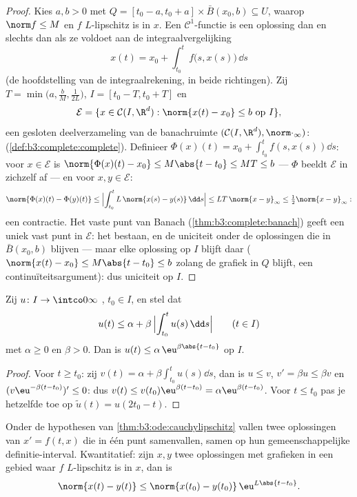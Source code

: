 \begin{proof}
Kies $a, b > 0$ met $Q = [t_0 - a, t_0 + a]\times\bar B(x_0, b)
\subseteq U$, waarop $\norm f \leq M$ en $f$ $L$-lipschitz is in
$x$. Een $\mathcal C^1$-functie is een oplossing dan en slechts
dan als ze voldoet aan de integraalvergelijking
\[
x(t) = x_0 + \int_{t_0}^{t}f\bigl(s, x(s)\bigr)\,\dd s
\]
(de hoofdstelling van de integraalrekening, in beide richtingen).
Zij $T = \min\bigl(a, \frac bM, \frac1{2L}\bigr)$, $I = [t_0 - T,
t_0 + T]$ en
\[
\mathcal E = \{x \in \mathcal C(I, \R^d) : \norm{x(t) - x_0}
\leq b\ \text{op } I\},
\]
een gesloten deelverzameling van de banachruimte $(\mathcal C(I,
\R^d), \norm\cdot_\infty)$: 
(\cref{def:b3:complete:complete}). Definieer $\Phi(x)(t) = x_0 +
\int_{t_0}^tf(s, x(s))\dd s$: voor $x \in \mathcal E$ is
$\norm{\Phi(x)(t) - x_0} \leq M\abs{t - t_0} \leq MT \leq b$ ---
$\Phi$ beeldt $\mathcal E$ in zichzelf af --- en voor $x, y \in
\mathcal E$:
\[
\norm{\Phi(x)(t) - \Phi(y)(t)} \leq \Bigl|\int_{t_0}^t
L\,\norm{x(s) - y(s)}\,\dd s\Bigr| \leq LT\,\norm{x -
y}_\infty \leq \tfrac12\norm{x - y}_\infty :
\]
een contractie. Het vaste punt van Banach
(\cref{thm:b3:complete:banach}) geeft een uniek vast punt in
$\mathcal E$: het bestaan, en de uniciteit onder de oplossingen
die in $\bar B(x_0, b)$ blijven --- maar elke oplossing op $I$
blijft daar ($\norm{x(t) - x_0} \leq M\abs{t - t_0} \leq b$
zolang de grafiek in $Q$ blijft, een continuïteitsargument): dus
uniciteit op $I$.
\end{proof}

\begin{lemma}[Grönwall]\label{lem:b3:ode:gronwall}
Zij $u \colon I \to \intco0\infty$ , $t_0 \in I$, en stel
dat
\[
u(t) \leq \alpha + \beta\,\Bigl|\int_{t_0}^{t}u(s)\,\dd
s\Bigr| \qquad (t \in I)
\]
met $\alpha \geq 0$ en $\beta > 0$. Dan is $u(t) \leq
\alpha\,\eu^{\beta\abs{t - t_0}}$ op $I$.
\end{lemma}

\begin{proof}
Voor $t \geq t_0$: zij $v(t) = \alpha + \beta\int_{t_0}^tu(s)\dd
s$, dan is $u \leq v$, $v' = \beta u \leq \beta v$ en $(v\eu^{-
\beta(t - t_0)})' \leq 0$: dus $v(t) \leq v(t_0)\eu^{\beta(t-t_0)}
= \alpha\eu^{\beta(t - t_0)}$. Voor $t \leq t_0$ pas je hetzelfde
toe op $\tilde u(t) = u(2t_0 - t)$.
\end{proof}

\begin{corollary}
\label{cor:b3:ode:uniqueness}
Onder de hypothesen van \cref{thm:b3:ode:cauchylipschitz} vallen
twee oplossingen van $x' = f(t,x)$ die in één punt samenvallen,
samen op hun gemeenschappelijke definitie-interval. Kwantitatief:
zijn $x, y$ twee oplossingen met grafieken in een gebied waar $f$
$L$-lipschitz is in $x$, dan is
\[
\norm{x(t) - y(t)} \leq \norm{x(t_0) -
y(t_0)}\,\eu^{L\abs{t - t_0}} .
\]
\end{corollary}

